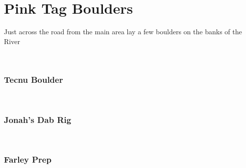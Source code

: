 \chapter{Pink Tag Boulders}\label{a:Pink Tag Boulders}
\lhead{\textcolor{\chapterColor}{\rule[-2pt]{\textwidth}{15pt}}}
Just across the road from the main area lay a few boulders on the banks of the River

\

\subsection*{Tecnu Boulder}\label{bf:Tecnu Boulder}
\

\subsection*{Jonah's Dab Rig}\label{bf:Jonah's Dab Rig}
\

\subsection*{Farley Prep}\label{bf:Farley Prep}
\

\clearpage